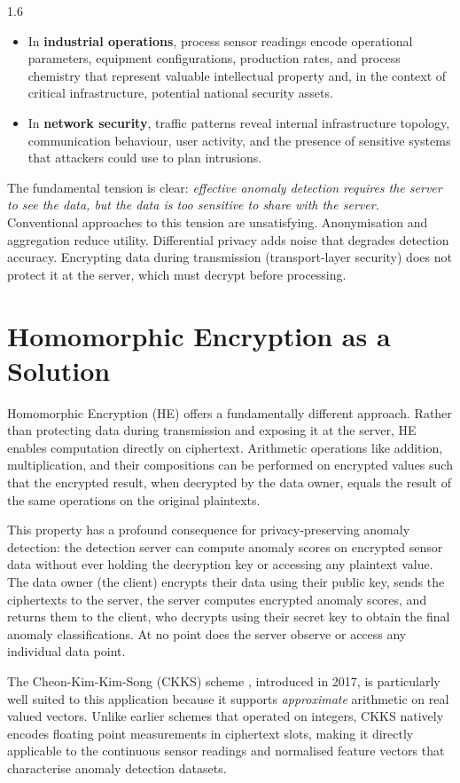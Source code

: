 \begin{spacing}{1.6}
\begin{itemize}
  \item In \textbf{industrial operations}, process sensor readings encode
  operational parameters, equipment configurations, production rates, and
  process chemistry that represent valuable intellectual property and, in the
  context of critical infrastructure, potential national security assets.

  \item In \textbf{network security}, traffic patterns reveal internal
  infrastructure topology, communication behaviour, user activity, and the
  presence of sensitive systems that attackers could use to plan intrusions.
\end{itemize}

The fundamental tension is clear: \textit{effective anomaly detection requires
the server to see the data, but the data is too sensitive to share with the
server.} Conventional approaches to this tension are unsatisfying. Anonymisation
and aggregation reduce utility. Differential privacy adds noise that degrades
detection accuracy. Encrypting data during transmission (transport-layer
security) does not protect it at the server, which must decrypt before
processing.

\section{Homomorphic Encryption as a Solution}

Homomorphic Encryption (HE) offers a fundamentally different approach. Rather
than protecting data during transmission and exposing it at the server, HE
enables computation directly on ciphertext. Arithmetic operations like addition,
multiplication, and their compositions can be performed on encrypted values
such that the encrypted result, when decrypted by the data owner, equals the
result of the same operations on the original plaintexts.

This property has a profound consequence for privacy-preserving anomaly
detection: the detection server can compute anomaly scores on encrypted sensor
data without ever holding the decryption key or accessing any plaintext value.
The data owner (the client) encrypts their data using their public key, sends
the ciphertexts to the server, the server computes encrypted anomaly scores, and
returns them to the client, who decrypts using their secret key to obtain the
final anomaly classifications. At no point does the server observe or access any
individual data point.

The Cheon-Kim-Kim-Song (CKKS) scheme \cite{ckks}, introduced in 2017, is
particularly well suited to this application because it supports
\textit{approximate} arithmetic on real valued vectors. Unlike earlier schemes
that operated on integers, CKKS natively encodes floating point measurements in
ciphertext slots, making it directly applicable to the continuous sensor
readings and normalised feature vectors that characterise anomaly detection
datasets.


\end{spacing}
